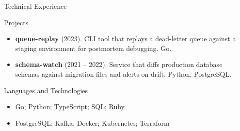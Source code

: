 \documentclass[]{mcdowellcv}
\begin{document}
	\begin{cvsection}{Technical Experience}
		\begin{cvsubsection}{Projects}{}{}
			\begin{itemize}
				\item \textbf{queue-replay} (2023). CLI tool that replays a dead-letter queue against a staging environment for postmortem debugging. Go.
				\item \textbf{schema-watch} (2021 -- 2022). Service that diffs production database schemas against migration files and alerts on drift. Python, PostgreSQL.
			\end{itemize}
		\end{cvsubsection}
	\end{cvsection}

	\begin{cvsection}{Languages and Technologies}
		\begin{cvsubsection}{}{}{}
			\begin{itemize}
				\item Go; Python; TypeScript; SQL; Ruby
				\item PostgreSQL; Kafka; Docker; Kubernetes; Terraform
			\end{itemize}
		\end{cvsubsection}
	\end{cvsection}
\end{document}
